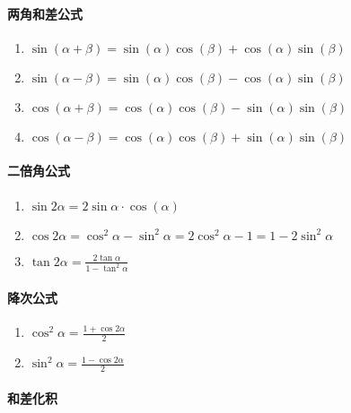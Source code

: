 \documentclass[
]{article}
\begin{document}
\hypertarget{ux4e24ux89d2ux548cux5deeux516cux5f0f}{%
\paragraph{两角和差公式}\label{ux4e24ux89d2ux548cux5deeux516cux5f0f}}

\begin{enumerate}
\def\labelenumi{\arabic{enumi}.}
\item
  \(\sin(\alpha+\beta)=\sin(\alpha)\cos(\beta)+\cos(\alpha)\sin(\beta)\)
\item
  \(\sin(\alpha-\beta)=\sin(\alpha)\cos(\beta)-\cos(\alpha)\sin(\beta)\)
\item
  \(\cos(\alpha+\beta)=\cos(\alpha)\cos(\beta)-\sin(\alpha)\sin(\beta)\)
\item
  \(\cos(\alpha-\beta)=\cos(\alpha)\cos(\beta)+\sin(\alpha)\sin(\beta)\)
\end{enumerate}

\hypertarget{ux4e8cux500dux89d2ux516cux5f0f}{%
\paragraph{二倍角公式}\label{ux4e8cux500dux89d2ux516cux5f0f}}

\begin{enumerate}
\def\labelenumi{\arabic{enumi}.}
\item
  \(\sin2\alpha=2\sin\alpha \cdot \cos(\alpha)\)
\item
  \(\cos2\alpha=\cos^2\alpha-\sin^2\alpha=2\cos^2\alpha-1=1-2\sin^2\alpha\)
\item
  \(\tan2\alpha=\frac{2\tan\alpha}{1-\tan^2\alpha}\)
\end{enumerate}

\hypertarget{ux964dux6b21ux516cux5f0f}{%
\paragraph{降次公式}\label{ux964dux6b21ux516cux5f0f}}

\begin{enumerate}
\def\labelenumi{\arabic{enumi}.}
\item
  \(\cos^2\alpha = \frac{1+\cos2\alpha}{2}\)
\item
  \(\sin^2\alpha = \frac{1-\cos2\alpha}{2}\)
\end{enumerate}

\hypertarget{ux548cux5deeux5316ux79ef}{%
\paragraph{和差化积}\label{ux548cux5deeux5316ux79ef}}
\end{document}
